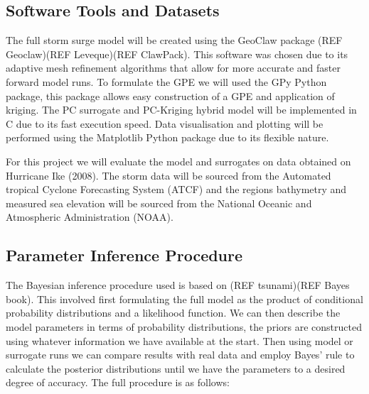 \documentclass[12pt,a4paper]{article}
\begin{document}
\subsection{Software Tools and Datasets}
\noindent
The full storm surge model will be created using the GeoClaw package (REF Geoclaw)(REF Leveque)(REF ClawPack). This software was chosen due to its adaptive mesh refinement algorithms that allow for more accurate and faster forward model runs. To formulate the GPE we will used the GPy Python package, this package allows easy construction of a GPE and application of kriging. The PC surrogate and PC-Kriging hybrid model will be implemented in C due to its fast execution speed. Data visualisation and plotting will be performed using the Matplotlib Python package due to its flexible nature.

For this project we will evaluate the model and surrogates on data obtained on Hurricane Ike (2008). The storm data will be sourced from the Automated tropical Cyclone Forecasting System (ATCF) and the regions bathymetry and measured sea elevation will be sourced from the National Oceanic and Atmospheric Administration (NOAA).
\subsection{Parameter Inference Procedure}
\noindent
The Bayesian inference procedure used is based on (REF tsunami)(REF Bayes book). This involved first formulating the full model as the product of conditional probability distributions and a likelihood function. We can then describe the model parameters in terms of probability distributions, the priors are constructed using whatever information we have available at the start. Then using model or surrogate runs we can compare results with real data and employ Bayes' rule to calculate the posterior distributions until we have the parameters to a desired degree of accuracy. The full procedure is as follows:
\end{document}
